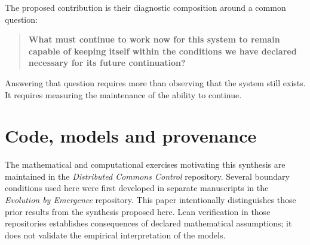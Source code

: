 The proposed contribution is their diagnostic composition around a common question:

\begin{quote}
\textbf{What must continue to work now for this system to remain capable of keeping itself within the conditions we have declared necessary for its future continuation?}
\end{quote}

Answering that question requires more than observing that the system still exists. It requires measuring the maintenance of the ability to continue.

\section*{Code, models and provenance}

The mathematical and computational exercises motivating this synthesis are maintained in the \emph{Distributed Commons Control} repository. Several boundary conditions used here were first developed in separate manuscripts in the \emph{Evolution by Emergence} repository. This paper intentionally distinguishes those prior results from the synthesis proposed here. Lean verification in those repositories establishes consequences of declared mathematical assumptions; it does not validate the empirical interpretation of the models.
